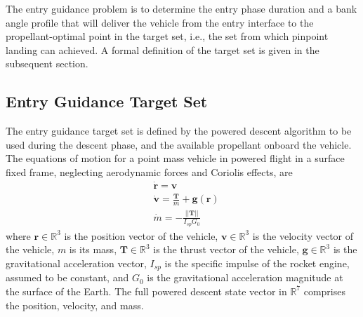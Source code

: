 \documentclass[letterpaper, paper,11pt]{AAS}
\begin{document}
The entry guidance problem is to determine the entry phase duration and a bank angle profile that will deliver the vehicle from the entry interface to the propellant-optimal point in the target set, i.e., the set from which pinpoint landing can achieved. A formal definition of the target set is given in the subsequent section.

\subsection{Entry Guidance Target Set}
The entry guidance target set is defined by the powered descent algorithm to be used during the descent phase, and the available propellant onboard the vehicle. The equations of motion for a point mass vehicle in powered flight in a surface fixed frame, neglecting aerodynamic forces and Coriolis effects, are
\begin{align}
&\dot{\mathbf{r}} = \mathbf{v} \label{eq_eom_srp} \\
&\dot{\mathbf{v}} = \frac{\mathbf{T}}{m} + \mathbf{g}(\mathbf{r}) \\
&\dot{m} = -\frac{||\mathbf{T}||}{I_{sp}G_0} \label{eq_eom_srp_end}
\end{align}
where $\mathbf{r}\in\mathbb{R}^3$ is the position vector of the vehicle, $\mathbf{v}\in\mathbb{R}^3$ is the velocity vector of the vehicle, $m$ is its mass, $\mathbf{T}\in\mathbb{R}^3$ is the thrust vector of the vehicle, $\mathbf{g}\in\mathbb{R}^3$ is the gravitational acceleration vector, $I_{sp}$ is the specific impulse of the rocket engine, assumed to be constant, and $G_0$ is the gravitational acceleration magnitude at the surface of the Earth. The full powered descent state vector in $\mathbb{R}^7$ comprises the position, velocity, and mass. 
\end{document}
